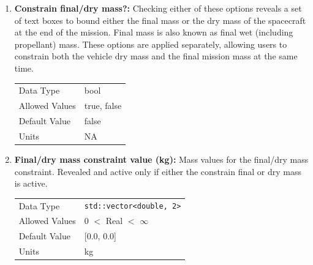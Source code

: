 \begin{enumerate}
    \item \textbf{Constrain final/dry mass?:} Checking either of these options reveals a set of text boxes to bound either the final mass or the dry mass of the spacecraft at the end of the mission. Final mass is also known as final wet (including propellant) mass. These options are applied separately, allowing users to constrain both the vehicle dry mass and the final mission mass at the same time. 

        \begin{table}[H]
            \hspace{2cm}
            \begin{tabular}{ll}
            Data Type & bool \\
            Allowed Values & true, false \\
            Default Value & false \\
            Units & NA
            \end{tabular}
        \end{table}

    \item \textbf{Final/dry mass constraint value (kg):} Mass values for the final/dry mass constraint. Revealed and active only if either the constrain final or dry mass is active.
    
        \begin{table}[H]
            \hspace{2cm}
            \begin{tabular}{ll}
            Data Type & \verb|std::vector<double, 2>| \\
            Allowed Values & 0 $<$ Real $<$ $\infty$ \\
            Default Value & [0.0, 0.0] \\
            Units & kg
            \end{tabular}
        \end{table}

\end{enumerate}